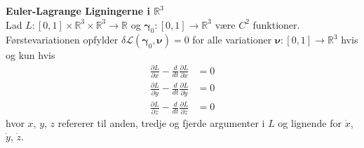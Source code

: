 \begin{thm}\label{ELiR3} {\bf Euler-Lagrange Ligningerne i $\mathbb{R}^3$}\\
Lad $L : [0,1] \times \mathbb{R}^3 \times \mathbb{R}^3 \to \mathbb{R}$ og ${\boldsymbol \gamma}_0 : [0,1] \to \mathbb{R}^3$ være $C^2$ funktioner. Førstevariationen opfylder $\delta \mathscr{L}({\boldsymbol \gamma}_0, {\boldsymbol \nu}) = 0$ for alle variationer ${\boldsymbol \nu} :  [0,1] \to \mathbb{R}^3$ hvis og kun hvis
\begin{align}
\frac{\partial L}{\partial x} -\frac{d}{dt}\frac{\partial L}{\partial \dot{x}} &= 0 \\
\frac{\partial L}{\partial y} -\frac{d}{dt} \frac{\partial L}{\partial \dot{y}} &=0 \\
\frac{\partial L}{\partial z} -\frac{d}{dt} \frac{\partial L}{\partial \dot{z}} &=0
\end{align}
hvor $x$, $y$, $z$ refererer til anden, tredje og fjerde argumenter i $L$ og lignende for $\dot{x}$, $\dot{y}$, $\dot{z}$.
\end{thm}
